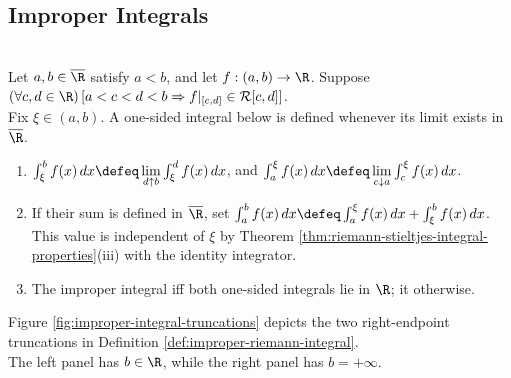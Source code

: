 \subsection{Improper Integrals}

\begin{definition} \label{def:improper-riemann-integral} \\
Let $a,b\in\overline{\R}$ satisfy $a<b$, and let $f:(a,b)\to\R$. Suppose $(\forall c,d\in\R)\,[a<c<d<b\Rightarrow f|_{[c,d]}\in\mathcal{R}[c,d]]$.\\
Fix $\xi\in(a,b)$. A one-sided integral below is defined whenever its limit exists in $\overline{\R}$.
\begin{enumerate}[label=(\roman*)]
\setlength{\itemsep}{0pt}
\item $\int_\xi^b f(x)\,dx\defeq\lim\limits_{d\uparrow b}\int_\xi^d f(x)\,dx$, and $\int_a^\xi f(x)\,dx\defeq\lim\limits_{c\downarrow a}\int_c^\xi f(x)\,dx$.
\item If their sum is defined in $\overline{\R}$, set $\int_a^b f(x)\,dx\defeq\int_a^\xi f(x)\,dx+\int_\xi^b f(x)\,dx$.\\
This value is independent of $\xi$ by Theorem \ref{thm:riemann-stieltjes-integral-properties}(iii) with the identity integrator.
\item The improper integral  iff both one-sided integrals lie in $\R$; it  otherwise.
\end{enumerate}
\end{definition}

\noindent Figure \ref{fig:improper-integral-truncations} depicts the two right-endpoint truncations in Definition \ref{def:improper-riemann-integral}.\\
The left panel has $b\in\R$, while the right panel has $b=+\infty$.
\begin{illustrationfigure}[H]
  \centering
  
  \caption{Compact truncations approach a finite singular endpoint on the left and $+\infty$ on the right.}
  \label{fig:improper-integral-truncations}
\end{illustrationfigure}

